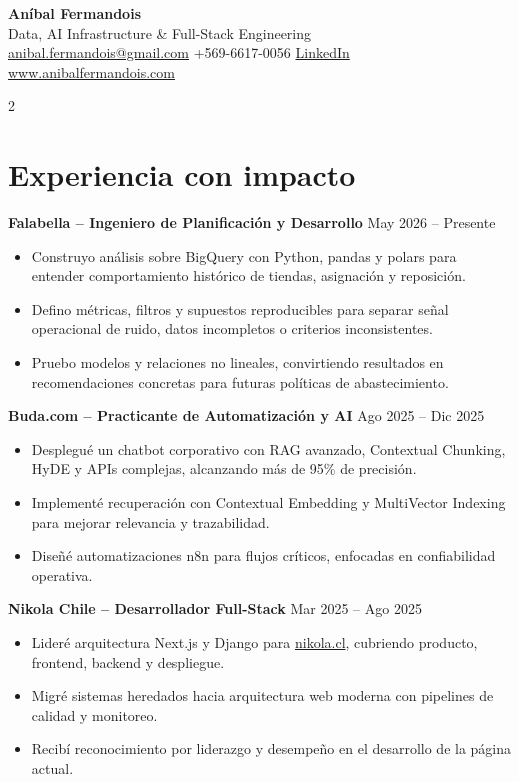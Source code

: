 \documentclass[10pt,letterpaper]{article}
\begin{document}
\begin{center}
{\fontsize{23}{24}\selectfont\bfseries Aníbal Fermandois}\\
{\color{accent}Data, AI Infrastructure \& Full-Stack Engineering}\\
\vspace{3pt}
\href{mailto:anibal.fermandois@gmail.com}{anibal.fermandois@gmail.com} \quad
+569-6617-0056 \quad
\href{https://www.linkedin.com/in/anibal-fermandois-224ab4262/}{LinkedIn} \quad
\href{https://www.anibalfermandois.com/}{www.anibalfermandois.com}
\end{center}

\begin{paracol}{2}

\section{Experiencia con impacto}
\textbf{Falabella -- Ingeniero de Planificación y Desarrollo} \hfill {\color{muted}May 2026 -- Presente}
\begin{itemize}
  \item Construyo análisis sobre BigQuery con Python, pandas y polars para entender comportamiento histórico de tiendas, asignación y reposición.
  \item Defino métricas, filtros y supuestos reproducibles para separar señal operacional de ruido, datos incompletos o criterios inconsistentes.
  \item Pruebo modelos y relaciones no lineales, convirtiendo resultados en recomendaciones concretas para futuras políticas de abastecimiento.
\end{itemize}

\textbf{Buda.com -- Practicante de Automatización y AI} \hfill {\color{muted}Ago 2025 -- Dic 2025}
\begin{itemize}
  \item Desplegué un chatbot corporativo con RAG avanzado, Contextual Chunking, HyDE y APIs complejas, alcanzando más de 95\% de precisión.
  \item Implementé recuperación con Contextual Embedding y MultiVector Indexing para mejorar relevancia y trazabilidad.
  \item Diseñé automatizaciones n8n para flujos críticos, enfocadas en confiabilidad operativa.
\end{itemize}

\textbf{Nikola Chile -- Desarrollador Full-Stack} \hfill {\color{muted}Mar 2025 -- Ago 2025}
\begin{itemize}
  \item Lideré arquitectura Next.js y Django para \href{https://www.nikola.cl}{nikola.cl}, cubriendo producto, frontend, backend y despliegue.
  \item Migré sistemas heredados hacia arquitectura web moderna con pipelines de calidad y monitoreo.
  \item Recibí reconocimiento por liderazgo y desempeño en el desarrollo de la página actual.
\end{itemize}


\end{paracol}
\end{document}

